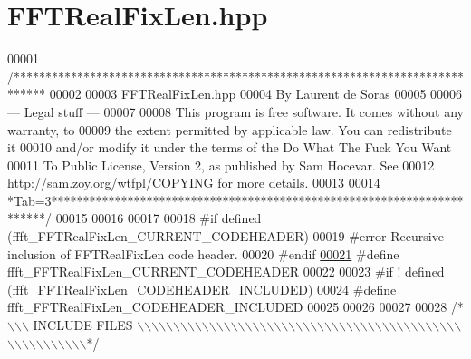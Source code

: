 \hypertarget{a00098_source}{\section{F\+F\+T\+Real\+Fix\+Len.\+hpp}
\label{a00098_source}
}

\begin{DoxyCode}
00001 \textcolor{comment}{/*****************************************************************************}
00002 \textcolor{comment}{}
00003 \textcolor{comment}{        FFTRealFixLen.hpp}
00004 \textcolor{comment}{        By Laurent de Soras}
00005 \textcolor{comment}{}
00006 \textcolor{comment}{--- Legal stuff ---}
00007 \textcolor{comment}{}
00008 \textcolor{comment}{This program is free software. It comes without any warranty, to}
00009 \textcolor{comment}{the extent permitted by applicable law. You can redistribute it}
00010 \textcolor{comment}{and/or modify it under the terms of the Do What The Fuck You Want}
00011 \textcolor{comment}{To Public License, Version 2, as published by Sam Hocevar. See}
00012 \textcolor{comment}{http://sam.zoy.org/wtfpl/COPYING for more details.}
00013 \textcolor{comment}{}
00014 \textcolor{comment}{*Tab=3***********************************************************************/}
00015 
00016 
00017 
00018 \textcolor{preprocessor}{#if defined (ffft\_FFTRealFixLen\_CURRENT\_CODEHEADER)}
00019 \textcolor{preprocessor}{    #error Recursive inclusion of FFTRealFixLen code header.}
00020 \textcolor{preprocessor}{#endif}
\hypertarget{a00098_source_l00021}{}\hyperlink{a00098_a149bda8b8afc272892194eefd93297ad}{00021} \textcolor{preprocessor}{#define ffft\_FFTRealFixLen\_CURRENT\_CODEHEADER}
00022 
00023 \textcolor{preprocessor}{#if ! defined (ffft\_FFTRealFixLen\_CODEHEADER\_INCLUDED)}
\hypertarget{a00098_source_l00024}{}\hyperlink{a00098_a67b6298694b98d1c4b1ebdae45f15904}{00024} \textcolor{preprocessor}{#define ffft\_FFTRealFixLen\_CODEHEADER\_INCLUDED}
00025 
00026 
00027 
00028 \textcolor{comment}{/*\(\backslash\)\(\backslash\)\(\backslash\) INCLUDE FILES \(\backslash\)\(\backslash\)\(\backslash\)\(\backslash\)\(\backslash\)\(\backslash\)\(\backslash\)\(\backslash\)\(\backslash\)\(\backslash\)\(\backslash\)\(\backslash\)\(\backslash\)\(\backslash\)\(\backslash\)\(\backslash\)\(\backslash\)\(\backslash\)\(\backslash\)\(\backslash\)\(\backslash\)\(\backslash\)\(\backslash\)\(\backslash\)\(\backslash\)\(\backslash\)\(\backslash\)\(\backslash\)\(\backslash\)\(\backslash\)\(\backslash\)\(\backslash\)\(\backslash\)\(\backslash\)\(\backslash\)\(\backslash\)\(\backslash\)\(\backslash\)\(\backslash\)\(\backslash\)\(\backslash\)\(\backslash\)\(\backslash\)\(\backslash\)\(\backslash\)\(\backslash\)\(\backslash\)\(\backslash\)\(\backslash\)\(\backslash\)\(\backslash\)\(\backslash\)\(\backslash\)\(\backslash\)\(\backslash\)\(\backslash\)*/}

\end{DoxyCode}
